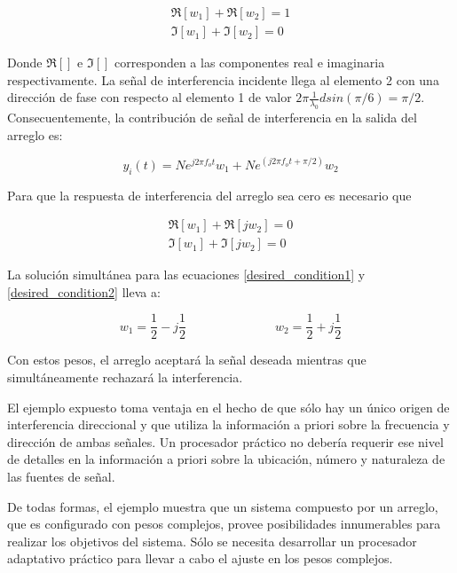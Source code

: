 \begin{equation}
\begin{array}{l}
\Re[w_1] + \Re[w_2] = 1\\
\Im[w_1] + \Im[w_2] = 0 \label{desired_condition1}
\end{array}
\end{equation}

Donde $\Re[]$ e $\Im[]$ corresponden a las componentes real e imaginaria respectivamente. La señal de interferencia incidente llega al elemento 2 con una dirección de fase con respecto al elemento 1 de valor $2 \pi \frac{1}{\lambda_0} d sin (\pi / 6) = \pi / 2$. Consecuentemente, la contribución de señal de interferencia en la salida del arreglo es:

\begin{equation}
y_i(t) = N e^{j 2 \pi f_o t}w_1 + N e^{(j 2 \pi f_o t + \pi / 2)} w_2 
\end{equation}

Para que la respuesta de interferencia del arreglo sea cero es necesario que

\begin{equation}
\begin{array}{l}
\Re[w_1] + \Re[jw_2] = 0\\
\Im[w_1] + \Im[jw_2] = 0 \label{desired_condition2}
\end{array}
\end{equation}

La solución simultánea para las ecuaciones \eqref{desired_condition1} y \eqref{desired_condition2} lleva a:

\[
w_1 = \frac{1}{2} - j \frac{1}{2} \hspace{3cm} w_2 = \frac{1}{2} + j \frac{1}{2}
\]

Con estos pesos, el arreglo aceptará la señal deseada mientras que simultáneamente rechazará la interferencia.

El ejemplo expuesto toma ventaja en el hecho de que sólo hay un único origen de interferencia direccional y que utiliza la información a priori sobre la frecuencia y dirección de ambas señales. Un procesador práctico no debería requerir ese nivel de detalles en la información a priori sobre la ubicación, número y naturaleza de las fuentes de señal.

De todas formas, el ejemplo muestra que un sistema compuesto por un arreglo, que es configurado con pesos complejos, provee posibilidades innumerables para realizar los objetivos del sistema. Sólo se necesita desarrollar un procesador adaptativo práctico para llevar a cabo el ajuste en los pesos complejos.

